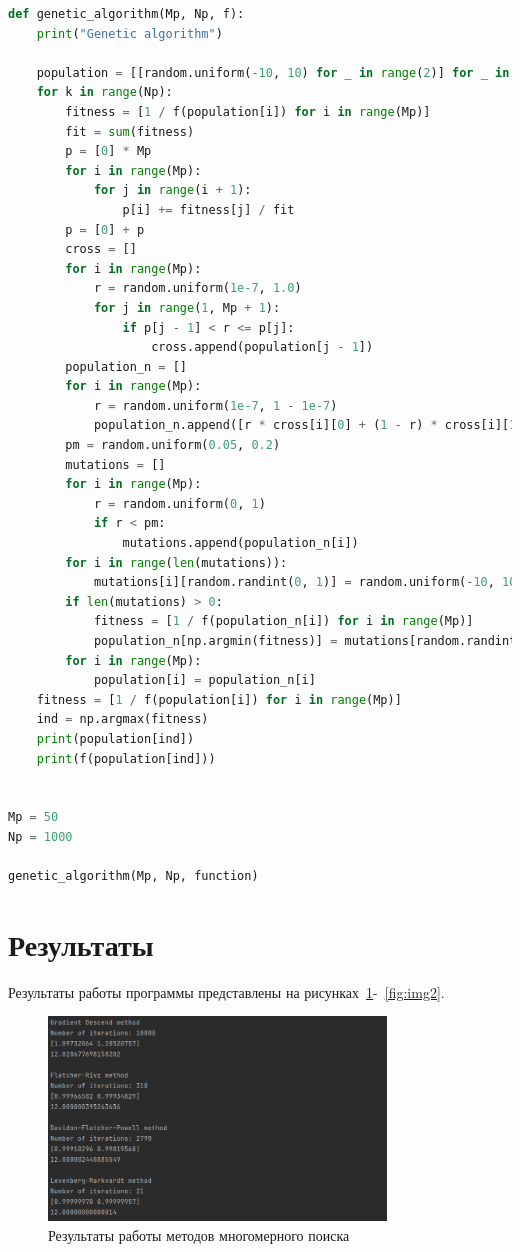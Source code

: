 \documentclass[a4paper, 14pt]{extarticle}
\begin{document}
\begin{lstlisting}[language={python},caption={Методы многомерного поиска. Генетический алгоритм},label={lst:code1}]
def genetic_algorithm(Mp, Np, f):
    print("Genetic algorithm")

    population = [[random.uniform(-10, 10) for _ in range(2)] for _ in range(Mp)]
    for k in range(Np):
        fitness = [1 / f(population[i]) for i in range(Mp)]
        fit = sum(fitness)
        p = [0] * Mp
        for i in range(Mp):
            for j in range(i + 1):
                p[i] += fitness[j] / fit
        p = [0] + p
        cross = []
        for i in range(Mp):
            r = random.uniform(1e-7, 1.0)
            for j in range(1, Mp + 1):
                if p[j - 1] < r <= p[j]:
                    cross.append(population[j - 1])
        population_n = []
        for i in range(Mp):
            r = random.uniform(1e-7, 1 - 1e-7)
            population_n.append([r * cross[i][0] + (1 - r) * cross[i][1] for _ in range(2)])
        pm = random.uniform(0.05, 0.2)
        mutations = []
        for i in range(Mp):
            r = random.uniform(0, 1)
            if r < pm:
                mutations.append(population_n[i])
        for i in range(len(mutations)):
            mutations[i][random.randint(0, 1)] = random.uniform(-10, 10)
        if len(mutations) > 0:
            fitness = [1 / f(population_n[i]) for i in range(Mp)]
            population_n[np.argmin(fitness)] = mutations[random.randint(0, len(mutations) - 1)]
        for i in range(Mp):
            population[i] = population_n[i]
    fitness = [1 / f(population[i]) for i in range(Mp)]
    ind = np.argmax(fitness)
    print(population[ind])
    print(f(population[ind]))


Mp = 50
Np = 1000

genetic_algorithm(Mp, Np, function)

\end{lstlisting}

\section{Результаты}\label{Sect::res}

Результаты работы программы представлены на рисунках~\ref{fig:img1}-~\ref{fig:img2}.

\begin{figure}[!htb]
	\centering
	\includegraphics[width=0.8\textwidth]{img1}
\caption{Результаты работы методов многомерного поиска}
\label{fig:img1}
\end{figure}
\end{document}

